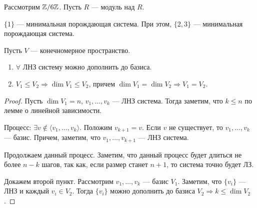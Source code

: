 \begin{example}
    Рассмотрим $\mathbb{Z} / 6 \mathbb{Z}$. Пусть  $R$ --- модуль над  $R$. 

    $\{1\}$ --- минимальная порождающая система. При этом,  $\{2, 3\}$ --- минимальная порождающая система.
\end{example}
\begin{lemma}
    Пусть $V$ --- конечномерное пространство.
    \begin{enumerate}
        \item $\forall $ ЛНЗ систему можно дополнить до базиса.
        \item $V_1 \le V_2 \Rightarrow \dim V_1 \le V_2$, причем $\dim V_1 = \dim V_2 \Rightarrow V_1 = V_2$.
    \end{enumerate}
\end{lemma}
\begin{proof}
   Пусть $\dim V_1 = n$, $v_1, \ldots, v_k$ --- ЛНЗ система. Тогда заметим, что $k \le n$ по лемме о линейной зависимости.

   Процесс: $\exists v \notin \langle v_1, \ldots, v_k \rangle$. Положим $v_{k+1} = v$. Если  $v$ не существует, то  $v_1, \ldots, v_k$ --- базис. Причем, заметим, что $v_1, \ldots, v_{k+1}$ --- ЛНЗ система. 

   Продолжаем данный процесс. Заметим, что данный процесс будет длиться не более $n-k$ шагов, так как, если размер станет  $n + 1$, то система точно будет ЛЗ.


   Докажем второй пункт. Рассмотрим  $v_1, \ldots, v_k$ --- базис $V_1$. Заметим, что $\{v_i\}$ --- ЛНЗ и каждый  $v_i \in V_2$. Тогда $\{v_i\}$ можно дополнить до базиса  $V_2 \Rightarrow k \le \dim V_2$.
\end{proof}


